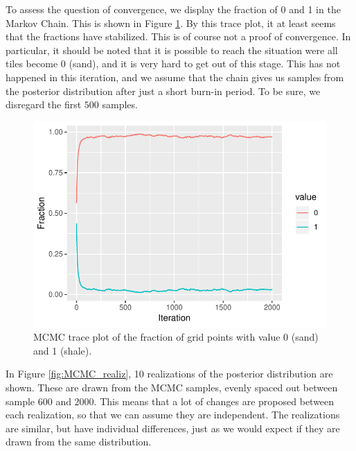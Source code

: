 To assess the question of convergence, we display the fraction of 0 and 1 in the Markov Chain. This is shown in Figure \ref{fig:MCMC_frac}. By this trace plot, it at least seems that the fractions have stabilized. This is of course not a proof of convergence. In particular, it should be noted that it is possible to reach the situation were all tiles become 0 (sand), and it is very hard to get out of this stage. This has not happened in this iteration, and we assume that the chain gives us samples from the posterior distribution after just a short burn-in period. To be sure, we disregard the first $500$ samples.

\begin{figure}
    \centering
    \includegraphics[scale=0.95]{figures/fractionMCMC.pdf}
    \caption{MCMC trace plot of the fraction of grid points with value 0 (sand) and 1 (shale).}
    \label{fig:MCMC_frac}
\end{figure}

In Figure \ref{fig:MCMC_realiz}, 10 realizations of the posterior distribution are shown. These are drawn from the MCMC samples, evenly spaced out between sample 600 and 2000. This means that a lot of changes are proposed between each realization, so that we can assume they are independent. The realizations are similar, but have individual differences, just as we would expect if they are drawn from the same distribution.

